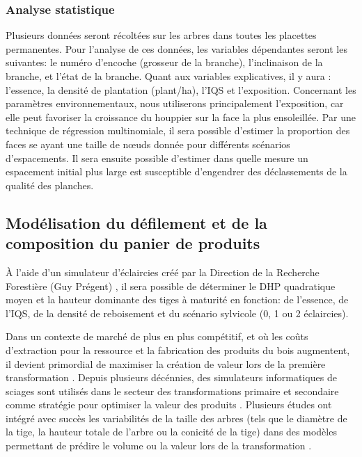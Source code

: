\documentclass[letterpaper, 12pt]{article}
\begin{document}
\begin{onehalfspace}
\subsubsection{Analyse statistique}

Plusieurs données seront récoltées sur les arbres dans toutes les placettes permanentes. Pour l'analyse de ces données, les variables dépendantes seront les suivantes: le numéro d'encoche (grosseur de la branche), l'inclinaison de la branche, et l'état de la branche. Quant aux variables explicatives, il y aura : l'essence, la densité de plantation (plant/ha), l'IQS et l'exposition. Concernant les paramètres environnementaux, nous utiliserons principalement l'exposition, car elle peut favoriser la croissance du houppier sur la face la plus ensoleillée. Par une technique de régression multinomiale, il sera possible d'estimer la proportion des faces se ayant une taille de nœuds donnée pour différents scénarios d'espacements. Il sera ensuite possible d'estimer dans quelle mesure un espacement initial plus large est susceptible d'engendrer des déclassements de la qualité des planches. 

\subsection{Modélisation du défilement et de la composition du panier de produits}

À l’aide d’un simulateur d’éclaircies créé par la Direction de la Recherche Forestière (Guy Prégent) %
, il sera possible de déterminer le DHP quadratique moyen et la hauteur dominante des tiges à maturité en fonction: de l’essence, de l’IQS, de la densité de reboisement et du scénario sylvicole (0, 1 ou 2 éclaircies). 

Dans un contexte de marché de plus en plus compétitif, et où les coûts d'extraction pour la ressource et la fabrication des produits du bois augmentent, il devient primordial de maximiser la création de valeur lors de la première transformation \cite{Briggs2010, Walker2013}. Depuis plusieurs décénnies, des simulateurs informatiques de sciages sont utilisés dans le secteur des transformations primaire et secondaire comme stratégie pour optimiser la valeur des produits \cite{FPInnovations2014}. Plusieurs études ont intégré avec succès les variabilités de la taille des arbres (tels que le diamètre de la tige, la hauteur totale de l’arbre ou la conicité de la tige) dans des modèles permettant de prédire le volume ou la valeur lors de la transformation \cite{Barrette2012,Liu2007}.



\end{onehalfspace}
\end{document}
